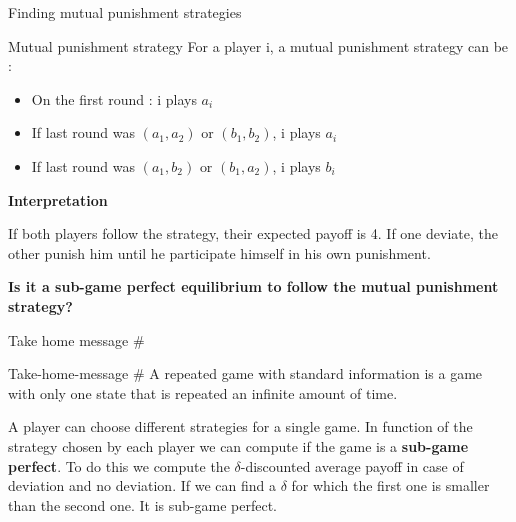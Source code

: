 \begin{frame}{Finding mutual punishment strategies}
    \begin{block}{Mutual punishment strategy}
        For a player i, a {\color{green}mutual punishment strategy} can be :
        \begin{itemize}
        	\item On the first round : i plays $a_i$ \pause
        	\item If last round was $(a_1,a_2) \text{ or } (b_1,b_2)$, i plays $a_i$ \pause
        	\item If last round was $(a_1,b_2) \text{ or } (b_1,a_2)$, i plays $b_i$
        \end{itemize}
    \end{block}
    \textbf{\color{green}Interpretation}
    
    If both players follow the strategy, their expected payoff is 4. If one deviate, the other punish him until he participate himself in his own punishment.
    
    \textbf{\color{green}Is it a sub-game perfect equilibrium to follow the mutual punishment strategy?}
    
\end{frame}

\begin{frame}{Take home message \#}
    \begin{block}{Take-home-message \#}
        A {\color{green}repeated game with standard information} is a game with only one state that is repeated an infinite amount of time.
        
        A player can choose different strategies for a single game. In function of the strategy chosen by each player we can compute if the game is a \textbf{sub-game perfect}. To do this we compute the $\delta$-discounted average payoff in case of deviation and no deviation. If we can find a $\delta$ for which the first one is smaller than the second one. It is sub-game perfect.
        
        
    \end{block}

\end{frame}
